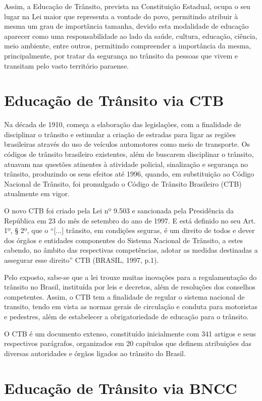 Assim, a Educação de Trânsito, prevista na Constituição Estadual, ocupa o seu lugar na Lei maior que representa a vontade do povo, permitindo atribuir à mesma um grau de importância tamanha, devido esta modalidade de educação aparecer como uma responsabilidade ao lado da saúde, cultura, educação, ciência, meio ambiente, entre outros, permitindo compreender a importância da mesma, principalmente, por tratar da segurança no trânsito da pessoas que vivem e transitam pelo vasto território paraense. 


\section{Educação de Trânsito via CTB}

Na década de 1910, começa a elaboração das legislações, com a finalidade de disciplinar o trânsito e estimular a criação de estradas para ligar as regiões brasileiras através do uso de veículos automotores como meio de transporte. Os códigos de trânsito brasileiro existentes, além de buscarem disciplinar o trânsito, atuavam nas questões atinentes à atividade policial, sinalização e segurança no trânsito, produzindo os seus efeitos até 1996, quando, em substituição ao Código Nacional de Trânsito, foi promulgado o Código de Trânsito Brasileiro (CTB) atualmente em vigor.\vskip0.3cm

O novo CTB foi criado pela Lei nº 9.503 e sancionada pela Presidência da República em 23 do mês de setembro do ano de 1997. E está definido no seu Art. 1º, § 2º, que o “[...] trânsito, em condições seguras, é um direito de todos e dever dos órgãos e entidades componentes do Sistema Nacional de Trânsito, a estes cabendo, no âmbito das respectivas competências, adotar as medidas destinadas a assegurar esse direito” CTB (BRASIL, 1997, p.1).\vskip0.3cm

Pelo exposto, sabe-se que a lei trouxe muitas inovações para a regulamentação do trânsito no Brasil, instituída por leis e decretos, além de resoluções dos conselhos competentes. Assim, o CTB tem a finalidade de regular o sistema nacional de transito, tendo em vista as normas gerais de circulação e conduta para motoristas e pedestres, além de estabelecer a obrigatoriedade de educação para o trânsito.\vskip0.3cm


O CTB é um documento extenso, constituído inicialmente com 341 artigos e seus respectivos parágrafos, organizados em 20 capítulos que definem atribuições das diversas autoridades e órgãos ligados ao trânsito do Brasil. 



\section{Educação de Trânsito via BNCC}